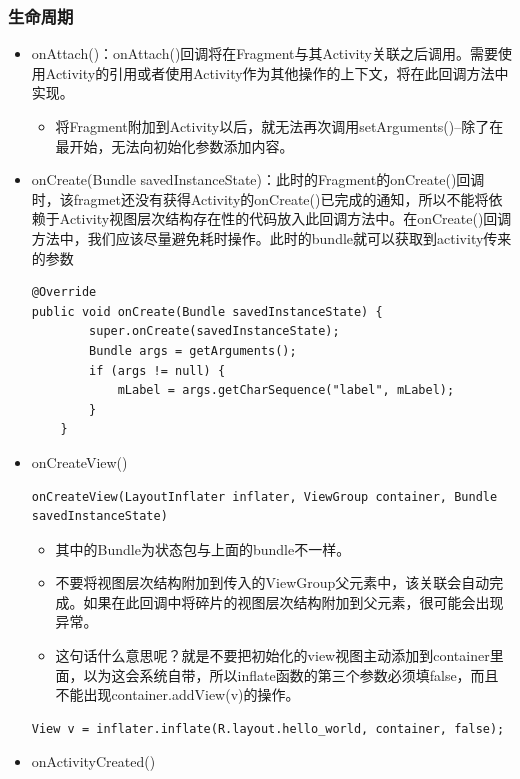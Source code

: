 \documentclass[9pt, b5paper]{article}
\begin{document}
\subsubsection{生命周期}
\label{sec-1-2-2}
\begin{itemize}
\item onAttach()：onAttach()回调将在Fragment与其Activity关联之后调用。需要使用Activity的引用或者使用Activity作为其他操作的上下文，将在此回调方法中实现。
\begin{itemize}
\item 将Fragment附加到Activity以后，就无法再次调用setArguments()--除了在最开始，无法向初始化参数添加内容。
\end{itemize}
\item onCreate(Bundle savedInstanceState)：此时的Fragment的onCreate()回调时，该fragmet还没有获得Activity的onCreate()已完成的通知，所以不能将依赖于Activity视图层次结构存在性的代码放入此回调方法中。在onCreate()回调方法中，我们应该尽量避免耗时操作。此时的bundle就可以获取到activity传来的参数
\begin{verbatim}
@Override
public void onCreate(Bundle savedInstanceState) {  
        super.onCreate(savedInstanceState);  
        Bundle args = getArguments();  
        if (args != null) {  
            mLabel = args.getCharSequence("label", mLabel);  
        }  
    }
\end{verbatim}
\item onCreateView()
\begin{verbatim}
onCreateView(LayoutInflater inflater, ViewGroup container, Bundle savedInstanceState)
\end{verbatim}
\begin{itemize}
\item 其中的Bundle为状态包与上面的bundle不一样。
\item 不要将视图层次结构附加到传入的ViewGroup父元素中，该关联会自动完成。如果在此回调中将碎片的视图层次结构附加到父元素，很可能会出现异常。
\item 这句话什么意思呢？就是不要把初始化的view视图主动添加到container里面，以为这会系统自带，所以inflate函数的第三个参数必须填false，而且不能出现container.addView(v)的操作。
\end{itemize}
\begin{verbatim}
View v = inflater.inflate(R.layout.hello_world, container, false);
\end{verbatim}
\item onActivityCreated()
\begin{itemize}

\end{itemize}
\end{itemize}
\end{document}
